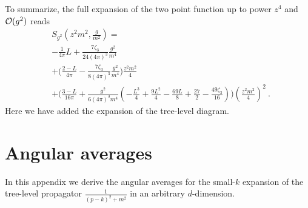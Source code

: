 \documentclass[a4paper,11pt]{article}
\begin{document}
 

To summarize, the full expansion of the two point function up to power $z^4$ and ${\cal O}(g^2)$ reads
\begin{align}
&S_{g^2}(z^2m^2,\frac{g}{m^2})=\nonumber \\&-\frac{1}{4\pi}L+\frac{7\zeta_3}{24(4\pi)^3}\frac{g^2}{m^4}\nonumber \\
& +\bigg(\frac{2-L}{4\pi}-\frac{7\zeta_3}{8(4\pi)^3}\frac{g^2}{m^4}\bigg)\frac{z^2m^2}{4} \nonumber \\ 
&+ \bigg(\frac{3-L}{16\pi}+\frac{g^2}{6(4\pi)^3m^4}\left(-\frac{L^3}{4}+\frac{9L^2}{4}-\frac{69L}{8}+\frac{27}{2}-\frac{49\zeta_3}{16}\right)\bigg)\left(\frac{z^2m^2}{4}\right)^2 \ .
\end{align}
Here we have added the expansion of the tree-level diagram. 

\section{Angular averages}\label{sec:angular}
In this appendix we derive the angular averages for the small-$k$ expansion of the tree-level propagator $\frac{1}{(p-k)^2+m^2}$ in an arbitrary $d$-dimension. 
\end{document}
